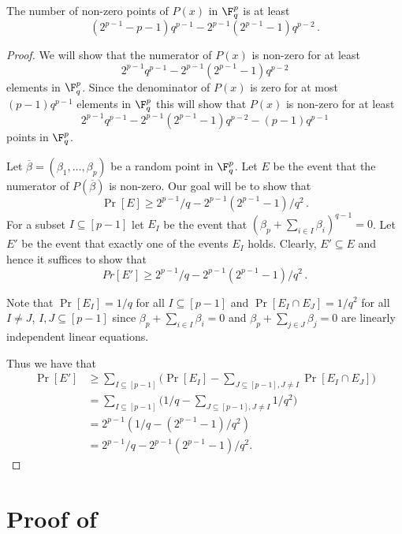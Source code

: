 \begin{lemma}\label{lem:tech-lem-non-zeros-lb}
The number of non-zero points of $P(x)$ in $\F_q^p$ is at least \[(2^{p-1}-p-1)q^{p-1} - 2^{p-1}(2^{p-1}-1)q^{p-2} \,.\]
\end{lemma}

\begin{proof}
We will show that the numerator of $P(x)$ is non-zero for at least $$2^{p-1}q^{p-1} -  2^{p-1}(2^{p-1}-1)q^{p-2}$$ elements in $\F_q^p$.
Since the denominator of $P(x)$ is zero for at most $(p-1)q^{p-1}$ elements in $ \F_q^p$ this will show that $P(x)$ is non-zero
for at least $$2^{p-1}q^{p-1} -  2^{p-1}(2^{p-1}-1)q^{p-2} - (p-1)q^{p-1}  $$ points in $\F_q^p$.

Let $ \overline \beta = (\beta_1,\ldots, \beta_p) $ be a random point in $\F_q^p$.
Let $E$ be the event that the numerator of $P(\overline \beta)$ is non-zero. Our goal will be to show that  $$\Pr[E] \geq  2^{p-1}/q - 2^{p-1}(2^{p-1}-1)/q^2\,.$$
For a subset $I \subseteq [p-1]$ let
$E_{I}$ be the event that $ (\beta_p + \sum_{i \in I} \beta_i )^{q-1} = 0$. Let $E'$ be the event that exactly one of the events $E_I$ holds. Clearly,
$E' \subseteq E$ and hence it suffices to show that $$Pr[E'] \geq  2^{p-1}/q - 2^{p-1}(2^{p-1}-1)/q^2\,.$$

 Note that $\Pr[E_I] = 1/q$ for all $I \subseteq [p-1]$ and
$\Pr[E_I \cap E_J] = 1/q^2$ for all $I \neq J$, $I,J \subseteq [p-1]$
since $\beta_p + \sum_{i \in I} \beta_i =0 $ and
$\beta_p + \sum_{j \in J} \beta_j = 0$ are linearly independent linear equations.

Thus we have that
%
\begin{align*}
\Pr[E'] &   \geq  \sum_{I \subseteq [p-1]} \bigg(\Pr[E_I] - \sum_{J \subseteq [p-1], J \neq I} \Pr[E_I \cap E_J] \bigg) \\
& = \sum_{I \subseteq [p-1]} \bigg(1/q -  \sum_{J \subseteq [p-1], J \neq I} 1/q^2 \bigg) \\[1ex]
& =   2^{p-1}(1/q - (2^{p-1} - 1)/q^2)  \\[1ex]
& =  2^{p-1}/q - 2^{p-1}(2^{p-1}-1)/q^2.
%
\end{align*}
\end{proof}



\section{Proof of }
\label{sec:final}

